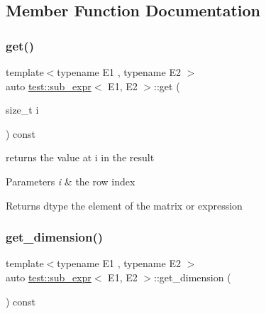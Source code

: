\subsection{Member Function Documentation}
\mbox{\label{classtest_1_1sub__expr_aa2d19c9aa74ca2dbf9c9b18662ab932a}} 
\subsubsection{\texorpdfstring{get()}{get()}}
{\footnotesize\ttfamily template$<$typename E1 , typename E2 $>$ \\
auto \mbox{\hyperlink{classtest_1_1sub__expr}{test\+::sub\+\_\+expr}}$<$ E1, E2 $>$\+::get (\begin{DoxyParamCaption}\item[{size\+\_\+t}]{i }\end{DoxyParamCaption}) const\hspace{0.3cm}{\ttfamily [inline]}}



returns the value at i in the result 


\begin{DoxyParams}{Parameters}
{\em i} & the row index \\
\hline
\end{DoxyParams}
\begin{DoxyReturn}{Returns}
dtype the element of the matrix or expression 
\end{DoxyReturn}
\mbox{\label{classtest_1_1sub__expr_ab98cf11cec8f1f403ce26f0b665544c3}} 
\subsubsection{\texorpdfstring{get\_dimension()}{get\_dimension()}}
{\footnotesize\ttfamily template$<$typename E1 , typename E2 $>$ \\
auto \mbox{\hyperlink{classtest_1_1sub__expr}{test\+::sub\+\_\+expr}}$<$ E1, E2 $>$\+::get\+\_\+dimension (\begin{DoxyParamCaption}{ }\end{DoxyParamCaption}) const\hspace{0.3cm}{\ttfamily [inline]}}



